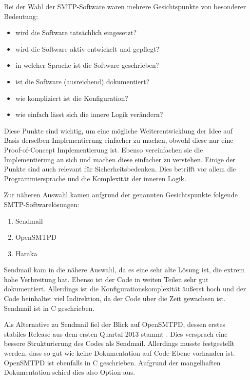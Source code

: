 Bei der Wahl der SMTP-Software waren mehrere Gesichtspunkte von besonderer Bedeutung:
\begin{itemize}
\item wird die Software tatsächlich eingesetzt?
\item wird die Software aktiv entwickelt und gepflegt?
\item in welcher Sprache ist die Software geschrieben?
\item ist die Software (ausreichend) dokumentiert?
\item wie kompliziert ist die Konfiguration?
\item wie einfach lässt sich die innere Logik verändern?
\end{itemize}

Diese Punkte sind wichtig, um eine mögliche Weiterentwicklung der Idee auf Basis derselben Implementierung einfacher zu machen, obwohl diese nur eine Proof-of-Concept Implementierung ist. Ebenso vereinfachen sie die Implementierung an sich und machen diese einfacher zu verstehen. Einige der Punkte sind auch relevant für Sicherheitsbedenken. Dies betrifft vor allem die Programmiersprache und die Komplexität der inneren Logik.

Zur näheren Auswahl kamen aufgrund der genannten Gesichtspunkte folgende SMTP-Softwarelösungen:
\begin{enumerate}
\item Sendmail 
\item OpenSMTPD 
\item Haraka 
\end{enumerate}

Sendmail kam in die nähere Auswahl, da es eine sehr alte Lösung ist, die extrem hohe Verbreitung hat. Ebenso ist der Code in weiten Teilen sehr gut dokumentiert. Allerdings ist die Konfigurationskomplexität äußerst hoch und der Code beinhaltet viel Indirektion, da der Code über die Zeit gewachsen ist. Sendmail ist in C geschrieben.

Als Alternative zu Sendmail fiel der Blick auf OpenSMTPD, dessen erstes stabiles Release aus dem ersten Quartal 2013 stammt . Dies versprach eine bessere Strukturierung des Codes als Sendmail. Allerdings musste festgestellt werden, dass so gut wie keine Dokumentation auf Code-Ebene vorhanden ist. OpenSMTPD ist ebenfalls in C geschrieben. Aufgrund der mangelhaften Dokumentation schied dies also Option aus.


